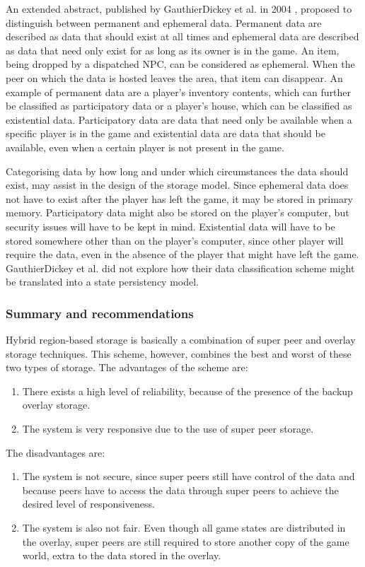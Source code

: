 \documentclass[10pt,a4paper,journal,cspaper,compsoc]{IEEEtran}
\begin{document}
An extended abstract, published by GauthierDickey et al. in 2004 \cite{hybrid_storage1}, proposed to distinguish between permanent and ephemeral
data. Permanent data are described as data that should exist at all times and ephemeral data are described as data that need only exist for as long
as its owner is in the game. An item, being dropped by a dispatched NPC, can be considered as ephemeral. When the peer on which the data is hosted
leaves the area, that item can disappear. An example of permanent data are a player's inventory contents, which can further be classified as
participatory data or a player's house, which can be classified as existential data. Participatory data are data that need only be available when a
specific player is in the game and existential data are data that should be available, even when a certain player is not present in the game.

Categorising data by how long and under which circumstances the data should exist, may assist in the design of the storage model. Since ephemeral
data does not have to exist after the player has left the game, it may be stored in primary memory. Participatory data might also be stored on the
player's computer, but security issues will have to be kept in mind. Existential data will have to be stored somewhere other than on the player's
computer, since other player will require the data, even in the absence of the player that might have left the game. GauthierDickey et al. did not
explore how their data classification scheme might be translated into a state persistency model.

\subsubsection{Summary and recommendations}

Hybrid region-based storage is basically a combination of super peer and overlay storage techniques. This scheme, however, combines the best and
worst of these two types of storage. The advantages of the scheme are:
%
\begin{enumerate}
    \item There exists a high level of reliability, because of the presence of the backup overlay storage.
    \item The system is very responsive due to the use of super peer storage.
\end{enumerate}

The disadvantages are:
%
\begin{enumerate}
    \item The system is not secure, since super peers still have control of the data and because peers have to access the data through super
        peers to achieve the desired level of responsiveness.
    \item The system is also not fair. Even though all game states are distributed in the overlay, super peers are still required to store
        another copy of the game world, extra to the data stored in the overlay.
\end{enumerate}
\end{document}
